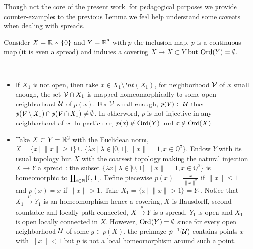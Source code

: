 Though not the core of the present work, for pedagogical purposes we provide counter-examples to the previous Lemma we feel help understand some caveats when dealing with spreads.
\begin{cex}[Openess of $Y_1$]

 Consider $X = \mathbb R\times \{0\} $ and $Y = \mathbb R^2$ with $p$ the inclusion map. $p$ is a continuous map (it is even a spread) and induces a covering $X\rightarrow X \subset Y$ but $\mathrm{Ord}(Y)=\emptyset$.
\end{cex}
\begin{cex}[Portlyness of $X_1$] \ 
\begin{itemize}
 \item If $X_1$ is not open, then take $x \in X_1\setminus Int(X_1)$, for neighborhood $\mathcal V$ of $x$ small enough, the set $\mathcal V\cap X_1$ is mapped homeomorphically to some open neighborhood $\mathcal{U}$ of $p(x)$. For $\mathcal V$ small enough, $p(\mathcal V)\subset \mathcal{U}$ thus $p(\mathcal V\setminus X_1) \cap p(\mathcal V\cap X_1)\neq \emptyset$. In otherword, $p$ is not injective in any neighborhood of $x$. 
 In particular, $p(x)\notin \mathrm{Ord}(Y)$ and  $x\notin \mathrm{Ord}(X)$.
 \item  Take $X\subset Y=\mathbb R^2$ with the Euclidean norm,
 $X=\{x~|~\|x\|\geq 1\} \cup \{\lambda x ~|~ \lambda \in ]0,1], \|x\|=1, x\in \mathbb Q^2\}$.  Endow $Y$ with its usual topology but $X$ with the coarsest topology making the natural injection $X\rightarrow Y$ a spread : the subset $\{\lambda x ~|~ \lambda \in ]0,1[, \|x\|=1, x\in \mathbb Q^2\}$ is homeomorphic to $\coprod_{i\in \mathbb{N}} ]0,1[$. 
  Define piecewise $p(x) = \frac{x}{\|x\|^2}$ if $\|x\|\leq 1$ and $p(x) = x$ if $\|x\|>1$. Take $X_1=\{x~|~\|x\|>1\}=Y_1$. Notice that $X_1\xrightarrow{p} Y_1$ is an homeomorphism hence a covering, $X$ is Hausdorff, second countable and locally path-connected, $X\xrightarrow{p}Y$ is a spread, $Y_1$ is open and $X_1$ is open locally connected in $X$.  However, $\mathrm{Ord}(Y)=\emptyset$ since for every open neighborhood $\mathcal{U}$ of some $y\in p(X)$, the preimage $p^{-1}(\mathcal{U})$ contains points $x$ with $\|x\|<1$ but $p$ is not a local homeomorphism around such a point. 
\end{itemize}

\end{cex}





